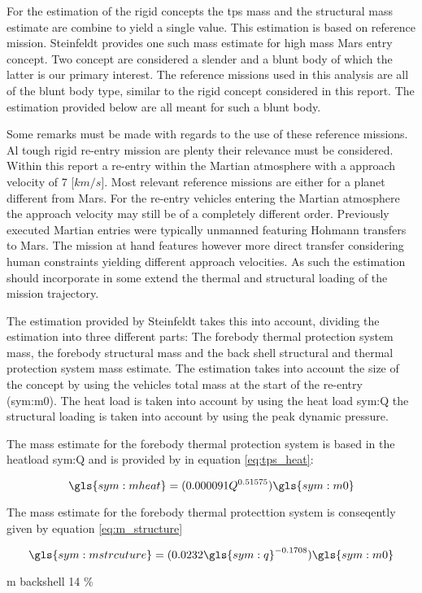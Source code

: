 For the estimation of the rigid concepts the \acrfull{tps} mass and the structural mass estimate are combine to yield a single value. This estimation is based on reference mission. Steinfeldt \cite{Steinfeldt2009} provides one such mass estimate for high mass Mars entry concept. Two concept are considered a slender and a blunt body of which the latter is our primary interest. The reference missions used in this analysis are all of the blunt body type, similar to the rigid concept considered in this report. The estimation provided below are all meant for such a blunt body.

Some remarks must be made with regards to the use of these reference missions. Al tough rigid re-entry mission are plenty their relevance must be considered. Within this report a re-entry within the Martian atmosphere with a approach velocity of 7 [$km/s$]. Most relevant reference missions are either for a planet different from Mars. For the re-entry vehicles entering the Martian atmosphere the approach velocity may still be of a completely different order. Previously executed Martian entries were typically unmanned featuring Hohmann transfers to Mars. The mission at hand features however more direct transfer considering human constraints yielding different approach velocities. As such the estimation should incorporate in some extend the thermal and structural loading of the mission trajectory.

The estimation provided by Steinfeldt takes this into account, dividing the estimation into three different parts: The forebody thermal protection system mass, the forebody structural mass and the back shell structural and thermal protection system mass estimate. The estimation takes into account the size of the concept by using the vehicles total mass at the start of the re-entry (\gls{sym:m0}). The heat load is taken into account by using the heat load \gls{sym:Q} the structural loading is taken into account by using the peak dynamic pressure.

The mass estimate for the forebody thermal protection system is based in the heatload \gls{sym:Q} and is provided by \cite{Laub2004} in equation \ref{eq:tps_heat}:

\begin{equation}
\gls{sym:mheat} = (0.000091Q^{0.51575})\gls{sym:m0}
\label{eq:tps_heat}
\end{equation}

The mass estimate for the forebody thermal protecttion system is conseqently given by equation \ref{eq:m_structure}

\begin{equation}
\gls{sym:mstrcuture} = (0.0232 \gls{sym:q} ^{-0.1708} ) \gls{sym:m0}
\label{eq:m_structure}
\end{equation}


m backshell 14 \%